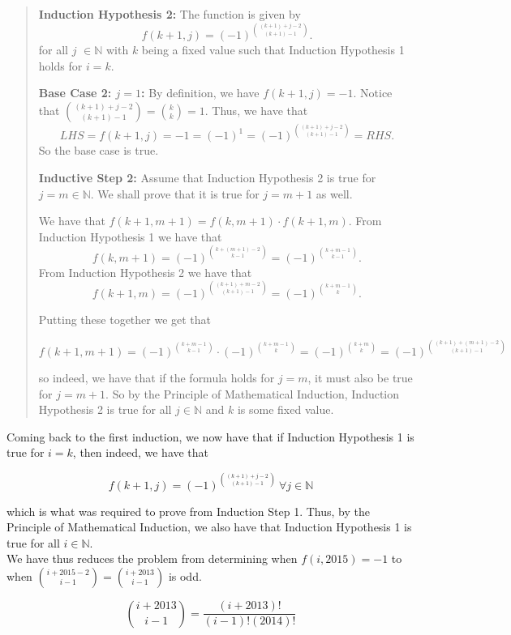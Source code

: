 \documentclass{article}
\begin{document}
\begin{enumerate}
\begin{quote}
\textbf{Induction Hypothesis 2:} The function is given by
$$f(k + 1, j) = (-1)^{\binom{(k + 1) + j - 2}{(k + 1) - 1}}. $$
for all $j$ $\in \mathbb{N}$ with $k$ being a fixed value such that Induction Hypothesis 1 holds for $i = k$.

\textbf{Base Case 2: $j = 1$:} By definition, we have $f(k + 1, j) = -1$. Notice that $\binom{(k + 1) + j - 2}{(k + 1) - 1} = \binom{k}{k} = 1$. Thus, we have that
$$LHS = f(k + 1, j) = -1 = (-1)^1 = (-1)^{\binom{(k + 1) + j - 2}{(k + 1) - 1}} = RHS.$$
So the base case is true.

\textbf{Inductive Step 2:} Assume that Induction Hypothesis 2 is true for $j = m \in \mathbb{N}$. We shall prove that it is true for $j = m + 1$ as well.

We have that $f(k + 1, m + 1) = f(k, m + 1) \cdot f(k + 1, m)$. From Induction Hypothesis 1 we have that 
$$f(k, m + 1) = (-1)^{\binom{k + (m + 1) - 2}{k - 1}} = (-1)^{\binom{k + m - 1}{k - 1}}.$$
From Induction Hypothesis 2 we have that
$$f(k + 1, m) = (-1)^{\binom{(k + 1) + m - 2}{(k + 1) - 1}} = (-1)^{\binom{k + m - 1}{k}}.$$

Putting these together we get that

$$f(k + 1, m + 1) = (-1)^{\binom{k + m - 1}{k - 1}} \cdot (-1)^{\binom{k + m - 1}{k}} = (-1)^{\binom{k + m}{k}} = (-1)^{\binom{(k + 1) + (m + 1) - 2}{(k + 1) - 1}}$$

so indeed, we have that if the formula holds for $j = m$, it must also be true for $j = m + 1$. So by the Principle of Mathematical Induction, Induction Hypothesis 2 is true for all $j \in \mathbb{N}$ and $k$ is some fixed value.
\end{quote}

Coming back to the first induction, we now have that if Induction Hypothesis 1 is true for $i = k$, then indeed, we have that

$$f(k + 1, j) = (-1)^{\binom{(k + 1) + j - 2}{(k + 1) - 1}} ~\forall j \in \mathbb{N}$$

which is what was required to prove from Induction Step 1. Thus, by the Principle of Mathematical Induction, we also have that Induction Hypothesis 1 is true for all $i \in \mathbb{N}$.\\

We have thus reduces the problem from determining when $f(i, 2015) = -1$ to when $\binom{i + 2015 - 2}{i - 1} = \binom{i + 2013}{i - 1}$ is odd.

$$\binom{i + 2013}{i - 1} = \frac{(i + 2013)!}{(i - 1)!(2014)!}$$


\end{enumerate}
\end{document}
